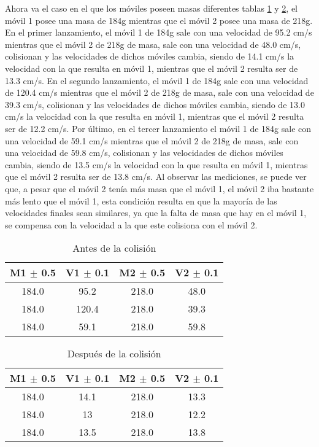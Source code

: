 \documentclass{article}
\begin{document}
Ahora va el caso en el que los móviles poseen masas diferentes tablas \ref{tab:colision2} y \ref{tab:despues_colision}, el móvil 1 posee una masa de 184g mientras que el móvil 2 posee una masa de 218g. En el primer lanzamiento, el móvil 1 de 184g sale con una velocidad de 95.2 cm/s mientras que el móvil 2 de 218g de masa, sale con una velocidad de 48.0 cm/s, colisionan y las velocidades de dichos móviles cambia, siendo de 14.1 cm/s la velocidad con la que resulta en móvil 1, mientras que el móvil 2 resulta ser de 13.3 cm/s. En el segundo lanzamiento, el móvil 1 de 184g sale con una velocidad de 120.4 cm/s mientras que el móvil 2 de 218g de masa, sale con una velocidad de 39.3 cm/s, colisionan y las velocidades de dichos móviles cambia, siendo de 13.0 cm/s la velocidad con la que resulta en móvil 1, mientras que el móvil 2 resulta ser de 12.2 cm/s. Por último, en el tercer lanzamiento el móvil 1 de 184g sale con una velocidad de 59.1 cm/s mientras que el móvil 2 de 218g de masa, sale con una velocidad de 59.8 cm/s, colisionan y las velocidades de dichos móviles cambia, siendo de 13.5 cm/s la velocidad con la que resulta en móvil 1, mientras que el móvil 2 resulta ser de 13.8 cm/s. Al observar las mediciones, se puede ver que, a pesar que el móvil 2 tenía más masa que el móvil 1, el móvil 2 iba bastante más lento que el móvil 1, esta condición resulta en que la mayoría de las velocidades finales sean similares, ya que la falta de masa que hay en el móvil 1, se compensa con la velocidad a la que este colisiona con el móvil 2.

\begin{table}[H]
\centering
\begin{tabular}{|c|c|c|c|}
\hline
M1 $\pm$ 0.5 & V1 $\pm$ 0.1 & M2 $\pm$ 0.5 & V2 $\pm$ 0.1 \\
\hline
184.0 & 95.2 & 218.0 & 48.0 \\
\hline
184.0 & 120.4 & 218.0 & 39.3 \\
\hline
184.0 & 59.1 & 218.0 & 59.8 \\
\hline
\end{tabular}
\caption{Antes de la colisión}
\label{tab:colision2}
\end{table}

\begin{table}[H]
\centering
\begin{tabular}{|c|c|c|c|}
\hline
M1 $\pm$ 0.5 & V1 $\pm$ 0.1 & M2 $\pm$ 0.5 & V2 $\pm$ 0.1 \\
\hline
184.0 & 14.1 & 218.0 & 13.3 \\
\hline
184.0 & 13 & 218.0 & 12.2 \\
\hline
184.0 & 13.5 & 218.0 & 13.8 \\
\hline
\end{tabular}
\caption{Después de la colisión}
\label{tab:despues_colision}
\end{table}
\end{document}
